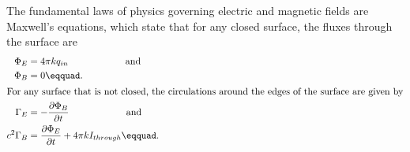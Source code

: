 The fundamental laws of physics governing
	electric and magnetic fields are Maxwell's equations, which state that
	for any closed surface, the fluxes through the surface are
	\begin{align*}
		\Phi_E		&= 4\pi kq_{in} \qquad\qquad\qquad \text{and}\\
		\Phi_B		&= 0\eqquad.\\
	\intertext{For any surface that is not closed, the circulations 
	around the edges of the surface are given by}
		\Gamma_E 	&= -\frac{\partial\Phi_B}{\partial t}  \qquad\qquad\qquad \text{and} \\
		c^2\Gamma_B 	&= \frac{\partial\Phi_E}{\partial t}  + 4\pi k I_{through}\eqquad.
	\end{align*}

